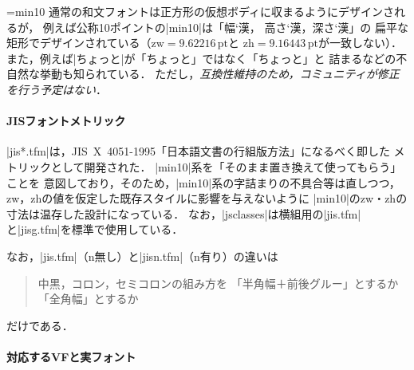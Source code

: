 \documentclass[a4paper,11pt,nomag]{jsarticle}
\begin{document}
\jfont\minten=min10 %
通常の和文フォントは正方形の仮想ボディに収まるようにデザインされるが，
例えば公称10ポイントの|min10|は「幅\the\fontcharwd\minten`漢，
高さ\the\fontcharht\minten`漢，深さ\the\fontchardp\minten`漢」の
扁平な矩形でデザインされている（$\mathrm{zw}=9.62216\,\mathrm{pt}$と
$\mathrm{zh}=9.16443\,\mathrm{pt}$が一致しない）．
また，例えば|ちょっと|が「ちょっと」ではなく「{\minten ちょっと}」と
詰まるなどの不自然な挙動も知られている\cite{min10otobe}．
ただし，\emph{互換性維持のため，コミュニティが修正を行う予定はない}．

\paragraph{JISフォントメトリック}

|jis*.tfm|は，JIS~X~4051-1995「日本語文書の行組版方法」になるべく即した
メトリックとして開発された\cite{jistfm}．
|min10|系を「そのまま置き換えて使ってもらう」ことを
意図しており，そのため，|min10|系の字詰まりの不具合等は直しつつ，
zw，zhの値を仮定した既存スタイルに影響を与えないように
|min10|のzw・zhの寸法は温存した設計になっている．
なお，|jsclasses|は横組用の|jis.tfm|と|jisg.tfm|を標準で使用している．


なお，|jis.tfm|（n無し）と|jisn.tfm|（n有り）の違いは
\begin{quote}
中黒，コロン，セミコロンの組み方を
「半角幅＋前後グルー」とするか「全角幅」とするか
\end{quote}
だけである．

\paragraph{対応するVFと実フォント}
\end{document}
